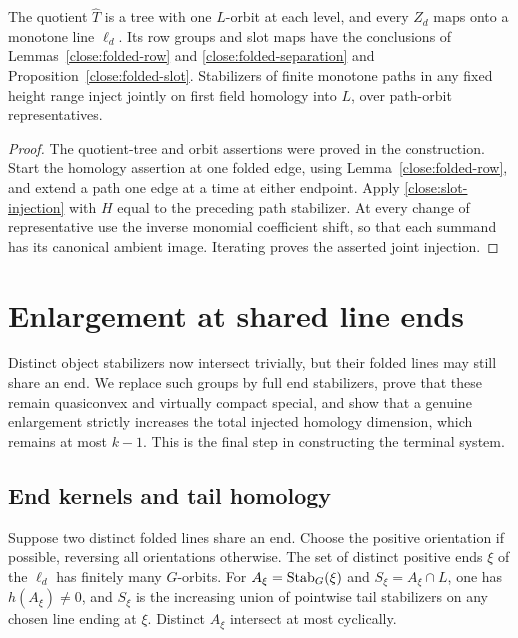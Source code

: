 \begin{corollary}\label{close:folding}
The quotient $\widehat T$ is a tree with one $L$-orbit at each level,
and every $Z_d$ maps onto a monotone line $\ell_d$. Its row groups and
slot maps have the conclusions of Lemmas~\ref{close:folded-row} and
\ref{close:folded-separation} and
Proposition~\ref{close:folded-slot}. Stabilizers of finite monotone
paths in any fixed height range inject jointly on first field
homology into $L$, over path-orbit representatives.
\end{corollary}

\begin{proof}
The quotient-tree and orbit assertions were proved in the construction.
Start the homology assertion at one folded edge, using
Lemma~\ref{close:folded-row}, and extend a path one edge at a time at
either endpoint. Apply \eqref{close:slot-injection} with $H$ equal to
the preceding path stabilizer. At every change of representative use
the inverse monomial coefficient shift, so that each summand has its
canonical ambient image. Iterating proves the asserted joint
injection.
\end{proof}

\section{Enlargement at shared line ends}\label{close:line-ends}

Distinct object stabilizers now intersect trivially, but their folded
lines may still share an end. We replace such groups by full end
stabilizers, prove that these remain quasiconvex and virtually compact
special, and show that a genuine enlargement strictly increases the
total injected homology dimension, which remains at most $k-1$. This
is the final step in constructing the terminal system.

\subsection{End kernels and tail homology}

\begin{lemma}\label{close:end-kernels}
Suppose two distinct folded lines share an end. Choose the positive
orientation if possible, reversing all orientations otherwise. The
set of distinct positive ends $\xi$ of the $\ell_d$ has finitely many
$G$-orbits. For $A_\xi=\operatorname{Stab}_G(\xi)$ and $S_\xi=A_\xi\cap L$, one has
$h(A_\xi)\ne0$, and $S_\xi$ is the increasing union of pointwise tail
stabilizers on any chosen line ending at $\xi$. Distinct $A_\xi$
intersect at most cyclically.
\end{lemma}

